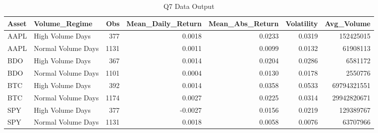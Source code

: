 \begin{table}[H]
\centering
\caption{Q7 Data Output}
\label{tab:q7}
\begin{tabular}{llrrrrr}
\toprule
Asset & Volume\_Regime & Obs & Mean\_Daily\_Return & Mean\_Abs\_Return & Volatility & Avg\_Volume \\
\midrule
AAPL & High Volume Days & 377 & 0.0018 & 0.0233 & 0.0319 & 152425015 \\
AAPL & Normal Volume Days & 1131 & 0.0011 & 0.0099 & 0.0132 & 61908113 \\
BDO & High Volume Days & 367 & 0.0014 & 0.0204 & 0.0286 & 6581172 \\
BDO & Normal Volume Days & 1101 & 0.0004 & 0.0130 & 0.0178 & 2550776 \\
BTC & High Volume Days & 392 & 0.0014 & 0.0358 & 0.0533 & 69794321551 \\
BTC & Normal Volume Days & 1174 & 0.0027 & 0.0225 & 0.0314 & 29942820671 \\
SPY & High Volume Days & 377 & -0.0027 & 0.0156 & 0.0219 & 129389767 \\
SPY & Normal Volume Days & 1131 & 0.0018 & 0.0058 & 0.0076 & 63707966 \\
\bottomrule
\end{tabular}
\end{table}
